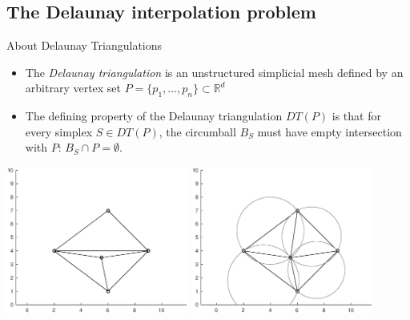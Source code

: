 \documentclass[xcolor=dvipsnames]{beamer}
\newcommand{\cmark}{\ding{51}}
\newcommand{\xmark}{\ding{55}}
\begin{document}
\subsection{The Delaunay interpolation problem}
\begin{frame}{About Delaunay Triangulations}
\begin{itemize}
\item The {\it Delaunay triangulation} is an unstructured simplicial mesh
defined by an arbitrary vertex set $P = \{p_1, \ldots, p_n\} \subset \mathbb{R}^d$
\item The defining property of the Delaunay triangulation $DT(P)$ is that
for every simplex $S \in DT(P)$, the circumball $B_S$ must have
empty intersection with $P$: $B_S \cap P = \emptyset$.
\end{itemize}
\begin{center}
\includegraphics[width=0.45\textwidth]{triangleplane.eps}{\color{Red} \xmark}
\includegraphics[width=0.45\textwidth]{delaunayplane.eps}{\color{Green} \cmark}
\end{center}
\end{frame}
\end{document}
